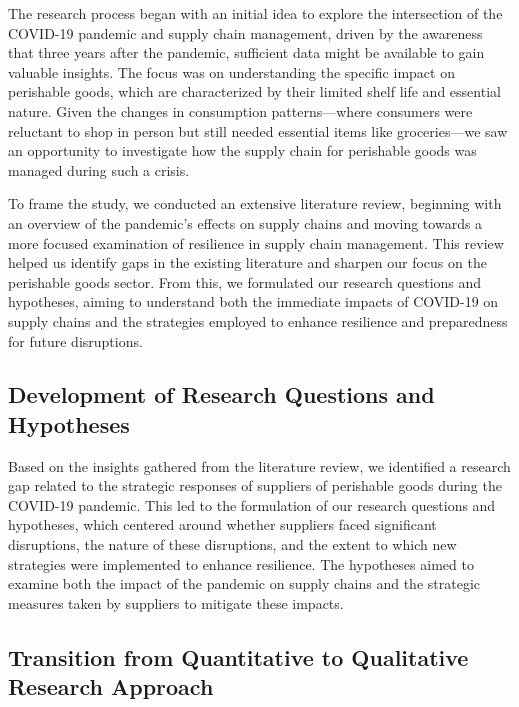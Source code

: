 The research process began with an initial idea to explore the intersection of the COVID-19 pandemic and supply chain management, driven by the awareness that three years after the pandemic, sufficient data might be available to gain valuable insights. The focus was on understanding the specific impact on perishable goods, which are characterized by their limited shelf life and essential nature. Given the changes in consumption patterns—where consumers were reluctant to shop in person but still needed essential items like groceries—we saw an opportunity to investigate how the supply chain for perishable goods was managed during such a crisis.

To frame the study, we conducted an extensive literature review, beginning with an overview of the pandemic's effects on supply chains and moving towards a more focused examination of resilience in supply chain management. This review helped us identify gaps in the existing literature and sharpen our focus on the perishable goods sector. From this, we formulated our research questions and hypotheses, aiming to understand both the immediate impacts of COVID-19 on supply chains and the strategies employed to enhance resilience and preparedness for future disruptions.

\subsection{Development of Research Questions and Hypotheses}

Based on the insights gathered from the literature review, we identified a research gap related to the strategic responses of suppliers of perishable goods during the COVID-19 pandemic. This led to the formulation of our research questions and hypotheses, which centered around whether suppliers faced significant disruptions, the nature of these disruptions, and the extent to which new strategies were implemented to enhance resilience. The hypotheses aimed to examine both the impact of the pandemic on supply chains and the strategic measures taken by suppliers to mitigate these impacts.

\subsection{Transition from Quantitative to Qualitative Research Approach}

